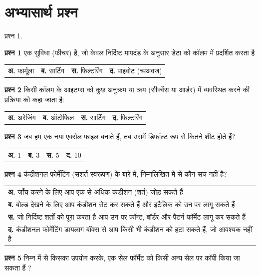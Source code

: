 \section*{अभ्यासार्थ प्रश्न}

\def\paragraphTitle#1{\par\noindent{\bfseries \color{red}{#1}}}
\paragraphTitle{वस्तुनिष्ठ प्रश्नः}
\begin{descriptionSimple}{प्रश्न 1.}
\item[\textbf{प्रश्न 1}] एक सुविधा (फीचर) है, जो केवल निर्दिष्ट मापदंड के अनुसार डेटा को कॉलम में प्रदर्शित करता है

	\begin{tabular}{llll}
	\textbf{अ.}  फार्मूला & \textbf{ब.}  सार्टिंग & \textbf{स.}  फिल्टरिंग & \textbf{द.} पाइवोट (च्पअवज)
	\end{tabular}

\item[\textbf{प्रश्न 2}] किसी कॉलम के आइटम्स को कुछ अनुक्रम या क्रम (सीक्वेंस या आर्डर) में व्यवस्थित करने की प्रक्रिया को कहा जाता हैः

	\begin{tabular}{llll}
		\textbf{अ.}  अरेजिंग & 
		\textbf{ब.} ऑटोफिल & 
		\textbf{स.} सार्टिंग &
		\textbf{द.} फिल्टरिंग
	\end{tabular}		
\item[\textbf{प्रश्न 3}] जब हम एक नया एक्सेल फाइल बनाते हैं, तब उसमें डिफॉल्ट रूप से कितने शीट होते हैं?

		\begin{tabular}{llll}
		\textbf{अ.}  1  &
		\textbf{ब.} 3  &
		\textbf{स.} 5  &
		\textbf{द.} 10
		\end{tabular}
\item[\textbf{प्रश्न 4}] कंडीशनल फोर्मेटिंग (सशर्त स्वरूपण) के बारे में, निम्नलिखित में से कौन सच नहीं है?

		\begin{tabular}{p{}}
		\textbf{अ.}  जाँच करने के लिए आप एक से अधिक कंडीशन (शर्त) जोड़ सकते हैं\\
		\textbf{ब.} बोल्ड देखने के लिए आप कंडीशन सेट कर सकते हैं और इटैलिक को उन पर लागू सकते हैं \\
		\textbf{स.} जो निर्दिष्ट शर्तों को पूरा करता है आप उन पर फॉन्ट, बॉर्डर और पैटर्न फॉर्मेट लागू कर सकते हैं\\
		\textbf{द.} कंडीशनल फोर्मेटिंग डायलाग बॉक्स से आप किसी भी कंडीशन को हटा सकते हैं, जो आवश्यक नहीं है
		\end{tabular}
\item[\textbf{प्रश्न 5}] निम्न में से किसका उपयोग करके, एक सेल फॉर्मेट को किसी अन्य सेल पर कॉपी किया जा सकता हैं ?


\end{descriptionSimple}
